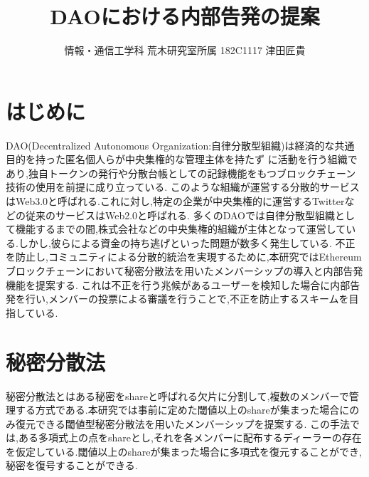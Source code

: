 \documentclass[twocolumn,10pt]{jarticle}
\title{\vspace{-1.5cm}\normalsize {\textbf {DAOにおける内部告発の提案}}}
\author{\vspace{-1.1cm} \normalsize	情報・通信工学科 荒木研究室所属 182C1117 津田匠貴}
\date{}
\begin{document}
\vspace{-10pt}
\maketitle

\section{\normalsize はじめに}
\vspace{-0.2cm}
DAO(Decentralized Autonomous Organization:自律分散型組織)は経済的な共通目的を持った匿名個人らが中央集権的な管理主体を持たず
に活動を行う組織であり,独自トークンの発行や分散台帳としての記録機能をもつブロックチェーン技術の使用を前提に成り立っている.
このような組織が運営する分散的サービスはWeb3.0と呼ばれる.これに対し,特定の企業が中央集権的に運営するTwitterなどの従来のサービスはWeb2.0と呼ばれる.
多くのDAOでは自律分散型組織として機能するまでの間,株式会社などの中央集権的組織が主体となって運営している.しかし,彼らによる資金の持ち逃げといった問題が数多く発生している.
不正を防止し,コミュニティによる分散的統治を実現するために,本研究ではEthereumブロックチェーンにおいて秘密分散法を用いたメンバーシップの導入と内部告発機能を提案する.
これは不正を行う兆候があるユーザーを検知した場合に内部告発を行い,メンバーの投票による審議を行うことで,不正を防止するスキームを目指している.

\vspace{-0.1cm}
\vspace{-0.55cm}
\section{\normalsize 秘密分散法}
\vspace{-0.2cm}
秘密分散法とはある秘密をshareと呼ばれる欠片に分割して,複数のメンバーで管理する方式である.本研究では事前に定めた閾値以上のshareが集まった場合にのみ復元できる閾値型秘密分散法を用いたメンバーシップを提案する.
この手法では,ある多項式上の点をshareとし,それを各メンバーに配布するディーラーの存在を仮定している.閾値以上のshareが集まった場合に多項式を復元することができ,秘密を復号することができる.

\vspace{-0.55cm}
\end{document}
